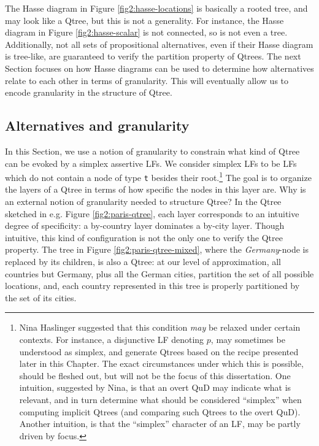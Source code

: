 The Hasse diagram in Figure \ref{fig2:hasse-locations} is basically a rooted tree, and may look like a Qtree, but this is not a generality. For instance, the Hasse diagram in Figure \ref{fig2:hasse-scalar} is not connected, so is not even a tree. Additionally, not all sets of propositional alternatives, even if their Hasse diagram is tree-like, are guaranteed to verify the partition property of Qtrees. The next Section focuses on how Hasse diagrams can be used to determine how alternatives relate to each other in terms of granularity. This will eventually allow us to encode granularity in the structure of Qtree.



\subsection{Alternatives and granularity}

In this Section, we use a notion of granularity to constrain what kind of Qtree can be evoked by a simplex assertive LFs. We consider simplex LFs to be LFs which do not contain a node of type \texttt{t} besides their root.\footnote{Nina Haslinger suggested that this condition \textit{may} be relaxed under certain contexts. For instance, a disjunctive LF denoting $p$, may sometimes be understood as simplex, and generate Qtrees based on the recipe presented later in this Chapter. The exact circumstances under which this is possible, should be fleshed out, but will not be the focus of this dissertation. One intuition, suggested by Nina, is that an overt QuD may indicate what is relevant, and in turn determine what should be considered ``simplex'' when computing implicit Qtrees (and comparing such Qtrees to the overt QuD). Another intuition, is that the ``simplex'' character of an LF, may be partly driven by focus.} The goal is to organize the layers of a Qtree in terms of how specific the nodes in this layer are. Why is an external notion of granularity needed to structure Qtree? In the Qtree sketched in e.g. Figure \ref{fig2:paris-qtree}, each layer corresponds to an intuitive degree of specificity: a by-country layer dominates a by-city layer. Though intuitive, this kind of configuration is not the only one to verify the Qtree property. The tree in Figure \ref{fig2:paris-qtree-mixed}, where the \textit{Germany}-node is replaced by its children, is also a Qtree: at our level of approximation, all countries but Germany, plus all the German cities, partition the set of all possible locations, and, each country represented in this tree is properly partitioned by the set of its cities.


